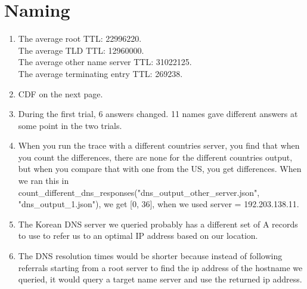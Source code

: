 \documentclass{article}
\begin{document}
\section{Naming}
    \begin{enumerate}
        \item
        The average root TTL: 22996220.\\
        The average TLD TTL: 12960000.\\
        The average other name server TTL: 31022125.\\
        The average terminating entry TTL: 269238.
        \item
        CDF on the next page. 
        \item
        During the first trial, 6 answers changed. 11 names gave different answers at some point in the two trials.
        \item
        When you run the trace with a different countries server, you find that when you count the differences, there are none for the different countries output, but when you compare that with one from the US, you get differences. When we ran this in count\_different\_dns\_responses("dns\_output\_other\_server.json", "dns\_output\_1.json"), we get [0, 36], when we used server = 192.203.138.11. 
        \item
        The Korean DNS server we queried probably has a different set of A records to use to refer us to an optimal IP address based on our location. 
        \item
        The DNS resolution times would be shorter because instead of following referrals starting from a root server to find the ip address of the hostname we queried, it would query a target name server and use the returned ip address.
        
    \end{enumerate}
\end{document}
